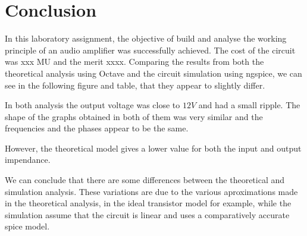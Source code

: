 \section{Conclusion}
\label{sec:conclusion}
In this laboratory assignment, the objective of build and analyse the working principle of an audio amplifier was successfully achieved.
The cost of the circuit was xxx MU and the merit xxxx.
Comparing the results from both the theoretical analysis using Octave and the circuit simulation using ngspice, we can see in the following figure and table, that they appear to slightly differ.

In both analysis the output voltage was close to $12 V$ and had a small ripple. The shape of the graphs obtained in both of them was very similar and the frequencies and the phases appear to be the same.

However, the theoretical model gives a lower value for both the input and output impendance. 

We can conclude that there are some differences between the theoretical and simulation analysis. These variations are due to the various aproximations made in the theoretical analysis, in the ideal transistor model for example, while the simulation assume that the circuit is linear and uses a comparatively accurate spice model.  



